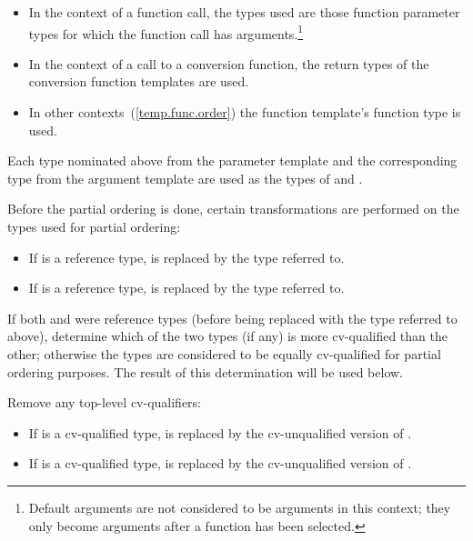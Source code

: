 \begin{itemize}
\item
In the context of a function call, the types used are those function parameter types
for which the function call has arguments.\footnote{Default arguments
are not considered to be arguments in this context; they only become arguments
after a function has been selected.}
\item
In the context of a call to a conversion function, the return types of
the conversion function templates are used.
\item
In other contexts~(\ref{temp.func.order}) the function template's function
type is used.
\end{itemize}

\pnum
Each type nominated above from the parameter template and the corresponding type from the
argument template are used as the types of
and
.

\pnum
Before the partial ordering is done, certain transformations are performed
on the types used for partial ordering:

\begin{itemize}
\item
If
is a reference type,
is replaced by the type referred to.
\item
If
is a reference type,
is replaced by the type referred to.
\end{itemize}

\pnum
If both
and
were reference types (before being replaced with the type referred to
above), determine which of the two types (if any) is more cv-qualified
than the other; otherwise the types are considered to be equally
cv-qualified for partial ordering purposes. The result of this
determination will be used below.

\pnum
Remove any top-level cv-qualifiers:
\begin{itemize}
\item
If
is a cv-qualified type,
is replaced by the cv-unqualified version of
.
\item
If
is a cv-qualified type,
is replaced by the cv-unqualified version of
.
\end{itemize}

